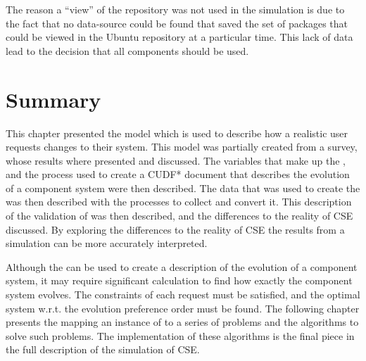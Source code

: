 The reason a ``view'' of the repository was not used in the simulation is due to the fact that no data-source could be found 
that saved the set of packages that could be viewed in the Ubuntu repository at a particular time.
This lack of data lead to the decision that all components should be used.

\section{Summary}
This chapter presented the \usermodel model which is used to describe how a realistic user requests changes to their system.
This model was partially created from a survey, whose results where presented and discussed.
The variables that make up the \usermodel, and the process used to create a CUDF* document that describes the evolution of a component system were then described.
The data that was used to create the \usermodel was then described with the processes to collect and convert it.
This description of the validation of \usermodel was then described, and the differences to the reality of CSE discussed.
By exploring the differences to the reality of CSE the results from a simulation can be more accurately interpreted.

Although the \usermodel can be used to create a description of the evolution of a component system, it may require significant calculation to find how exactly the component system evolves.
The constraints of each request must be satisfied, and the optimal system w.r.t. the evolution preference order must be found.
The following chapter presents the mapping an instance of \modelname to a series of \modelimpl problems and the algorithms to solve such problems.
The implementation of these algorithms is the final piece in the full description of the simulation of CSE.

